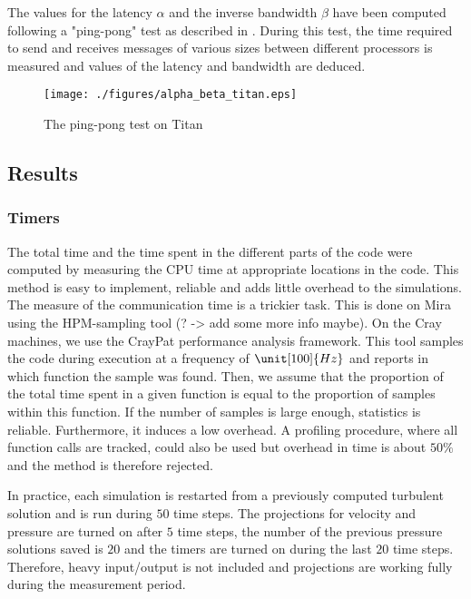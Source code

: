\documentclass{sig-alternate}
\begin{document}
The values for the latency $\alpha$ and the inverse bandwidth $\beta$ have been computed following a "ping-pong" test as described in \cite{fischer:scaling}. During this test, the time required to send and receives messages of various sizes between different processors is measured and values of the latency and bandwidth are deduced.

\begin{figure} \label{fig:alpha_beta_titan}
\centering
\texttt{[image: ./figures/alpha\_beta\_titan.eps]}
\caption{The ping-pong test on Titan}
\end{figure}


\subsection{Results}

\subsubsection{Timers}

The total time and the time spent in the different parts of the code were computed by measuring the CPU time at appropriate locations in the code. This method is easy to implement, reliable and adds little overhead to the simulations. The measure of the communication time is a trickier task. This is done on Mira using the HPM-sampling tool (? -> add some more info maybe). On the Cray machines, we use the CrayPat performance analysis framework. This tool samples the code during execution at a frequency of $\unit[100]{Hz}$ and reports in which function the sample was found. Then, we assume that the proportion of the total time spent in a given function is equal to the proportion of samples within this function. If the number of samples is large enough, statistics is reliable. Furthermore, it induces a low overhead. A profiling procedure, where all function calls are tracked, could also be used but overhead in time is about $50\%$ and the method is therefore rejected.

In practice, each simulation is restarted from a previously computed turbulent solution and is run during $50$ time steps. The projections for velocity and pressure are turned on after $5$ time steps, the number of the previous pressure solutions saved is $20$ and the timers are turned on during the last $20$ time steps. Therefore, heavy input/output is not included and projections are working fully during the measurement period.
\end{document}
